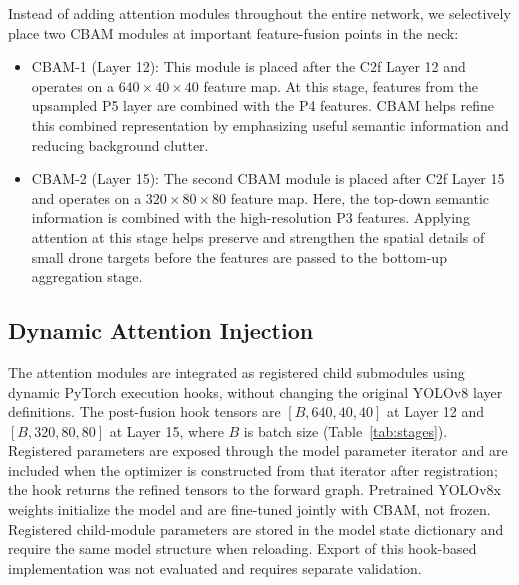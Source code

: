 \documentclass[conference]{IEEEtran}
\begin{document}
Instead of adding attention modules throughout the entire network, we selectively place two CBAM modules at important feature-fusion points in the neck:
\begin{itemize}
\item CBAM-1 (Layer 12): This module is placed after the C2f Layer 12 and operates on a $640\times40\times40$ feature map. At this stage, features from the upsampled P5 layer are combined with the P4 features. CBAM helps refine this combined representation by emphasizing useful semantic information and reducing background clutter.
\item CBAM-2 (Layer 15): The second CBAM module is placed after C2f Layer 15 and operates on a $320\times80\times80$ feature map. Here, the top-down semantic information is combined with the high-resolution P3 features. Applying attention at this stage helps preserve and strengthen the spatial details of small drone targets before the features are passed to the bottom-up aggregation stage.
\end{itemize}

\subsection{Dynamic Attention Injection}

The attention modules are integrated as registered child submodules using dynamic PyTorch execution hooks, without changing the original YOLOv8 layer definitions. The post-fusion hook tensors are $[B,640,40,40]$ at Layer 12 and $[B,320,80,80]$ at Layer 15, where $B$ is batch size (Table~\ref{tab:stages}). Registered parameters are exposed through the model parameter iterator and are included when the optimizer is constructed from that iterator after registration; the hook returns the refined tensors to the forward graph. Pretrained YOLOv8x weights initialize the model and are fine-tuned jointly with CBAM, not frozen. Registered child-module parameters are stored in the model state dictionary and require the same model structure when reloading. Export of this hook-based implementation was not evaluated and requires separate validation.
\end{document}
